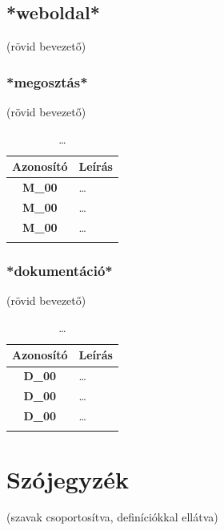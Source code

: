 \documentclass{article}
\begin{document}
\subsection{*weboldal*}
(rövid bevezető)

\subsubsection{*megosztás*}
(rövid bevezető)

\begingroup
\centering
\begin{longtable}{|c|p{14cm}|}
\hline
\textbf{Azonosító} & \textbf{Leírás}        \\ 
\hline
       \textbf{M\_00}  & … \\\hline
       \textbf{M\_00}  & … \\\hline
       \textbf{M\_00}  & … \\\hline
\hline
\caption{…}
\end{longtable}
\endgroup


\subsubsection{*dokumentáció*}
(rövid bevezető)

\begingroup
\centering
\begin{longtable}{|c|p{14cm}|}
\hline
\textbf{Azonosító} & \textbf{Leírás}        \\ 
\hline
       \textbf{D\_00}  & … \\\hline
       \textbf{D\_00}  & … \\\hline
       \textbf{D\_00}  & … \\\hline
\hline
\caption{…}
\end{longtable}
\endgroup


\pagebreak
\section{Szójegyzék}

(szavak csoportosítva, definíciókkal ellátva)
\end{document}
